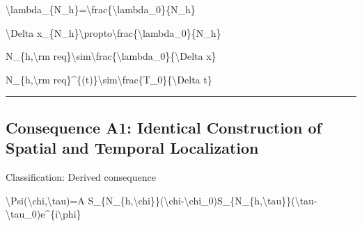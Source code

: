 \documentclass[
  a4paper,
]{article}
\newenvironment{Shaded}{}{}
\newcommand{\NormalTok}[1]{#1}
\begin{document}
\begin{Shaded}
\begin{Highlighting}[]
\NormalTok{\textbackslash{}lambda\_\{N\_h\}=\textbackslash{}frac\{\textbackslash{}lambda\_0\}\{N\_h\}}
\end{Highlighting}
\end{Shaded}

\begin{Shaded}
\begin{Highlighting}[]
\NormalTok{\textbackslash{}Delta x\_\{N\_h\}\textbackslash{}propto\textbackslash{}frac\{\textbackslash{}lambda\_0\}\{N\_h\}}
\end{Highlighting}
\end{Shaded}

\begin{Shaded}
\begin{Highlighting}[]
\NormalTok{N\_\{h,\textbackslash{}rm req\}\textbackslash{}sim\textbackslash{}frac\{\textbackslash{}lambda\_0\}\{\textbackslash{}Delta x\}}
\end{Highlighting}
\end{Shaded}

\begin{Shaded}
\begin{Highlighting}[]
\NormalTok{N\_\{h,\textbackslash{}rm req\}\^{}\{(t)\}\textbackslash{}sim\textbackslash{}frac\{T\_0\}\{\textbackslash{}Delta t\}}
\end{Highlighting}
\end{Shaded}

\begin{center}\rule{0.5\linewidth}{0.5pt}\end{center}

\subsection{Consequence A1: Identical Construction of Spatial and
Temporal
Localization}\label{consequence-a1-identical-construction-of-spatial-and-temporal-localization}

Classification: Derived consequence

\begin{Shaded}
\begin{Highlighting}[]
\NormalTok{\textbackslash{}Psi(\textbackslash{}chi,\textbackslash{}tau)=A S\_\{N\_\{h,\textbackslash{}chi\}\}(\textbackslash{}chi{-}\textbackslash{}chi\_0)S\_\{N\_\{h,\textbackslash{}tau\}\}(\textbackslash{}tau{-}\textbackslash{}tau\_0)e\^{}\{i\textbackslash{}phi\}}
\end{Highlighting}
\end{Shaded}
\end{document}
